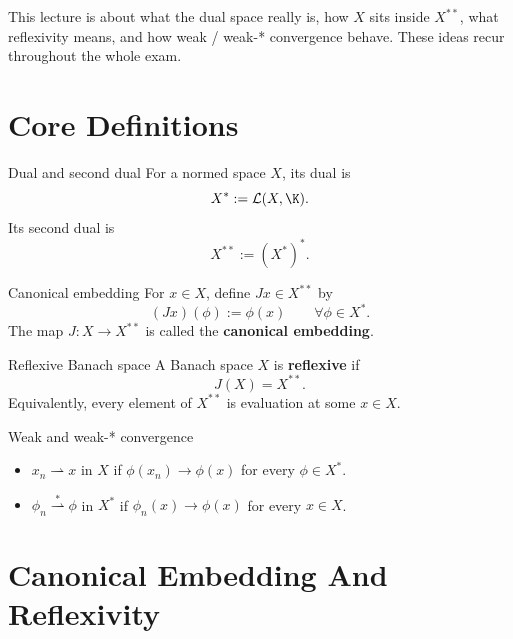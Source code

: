\documentclass[11pt]{article}
\begin{document}

\vspace{0.8em}

\begin{focusbox}
This lecture is about what the dual space really is, how $X$ sits inside $X^{**}$, what reflexivity means, and how weak / weak-* convergence behave. These ideas recur throughout the whole exam.
\end{focusbox}

\tableofcontents

\section{Core Definitions}

\begin{defbox}{Dual and second dual}
For a normed space $X$, its dual is
\[
X^*:=\mathcal L(X,\K).
\]
Its second dual is
\[
X^{**}:=(X^*)^*.
\]
\end{defbox}

\begin{defbox}{Canonical embedding}
For $x\in X$, define $Jx\in X^{**}$ by
\[
(Jx)(\phi):=\phi(x)
\qquad \forall \phi\in X^*.
\]
The map $J:X\to X^{**}$ is called the \textbf{canonical embedding}.
\end{defbox}

\begin{defbox}{Reflexive Banach space}
A Banach space $X$ is \textbf{reflexive} if
\[
J(X)=X^{**}.
\]
Equivalently, every element of $X^{**}$ is evaluation at some $x\in X$.
\end{defbox}

\begin{defbox}{Weak and weak-* convergence}
\begin{itemize}
\item $x_n\rightharpoonup x$ in $X$ if $\phi(x_n)\to \phi(x)$ for every $\phi\in X^*$.
\item $\phi_n\overset{*}{\rightharpoonup}\phi$ in $X^*$ if $\phi_n(x)\to \phi(x)$ for every $x\in X$.
\end{itemize}
\end{defbox}

\section{Canonical Embedding And Reflexivity}
\end{document}
